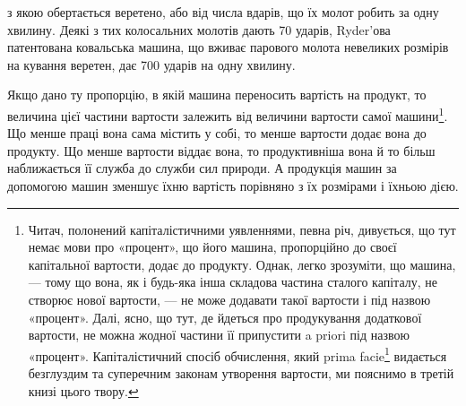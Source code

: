 \parcont{}  %
з якою обертається веретено, або від числа вдарів, що їх молот
робить за одну хвилину. Деякі з тих колосальних молотів дають
70 ударів, Ryder’ова патентована ковальська машина, що вживає
парового молота невеликих розмірів на кування веретен, дає
700 ударів на одну хвилину.

Якщо дано ту пропорцію, в якій машина переносить вартість
на продукт, то величина цієї частини вартости залежить від величини
вартости самої машини\footnote{
Читач, полонений капіталістичними уявленнями, певна річ, дивується,
що тут немає мови про «процент», що його машина, пропорційно
до своєї капітальної вартости, додає до продукту. Однак, легко зрозуміти,
що машина, — тому що вона, як і будь-яка інша складова частина
сталого капіталу, не створює нової вартости, — не може додавати такої
вартости і під назвою «процент». Далі, ясно, що тут, де йдеться про продукування
додаткової вартости, не можна жодної частини її припустити
a priori під назвою «процент». Капіталістичний спосіб обчислення,
який prima facie\footnote*{
на перший погляд. 
} видається безглуздим та суперечним законам утворення
вартости, ми пояснимо в третій книзі цього твору.
}. Що менше праці вона сама містить
у собі, то менше вартости додає вона до продукту. Що менше
вартости віддає вона, то продуктивніша вона й то більш наближається
її служба до служби сил природи. А продукція машин за
допомогою машин зменшує їхню вартість порівняно з їх розмірами
і їхньою дією.

